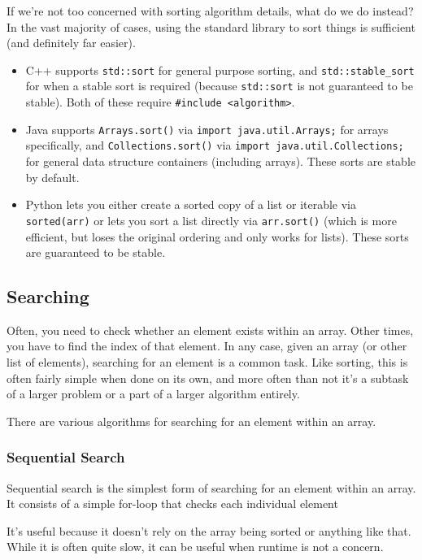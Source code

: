 If we're not too concerned with sorting algorithm details, what do we do instead? In the vast majority of cases, using the standard library to sort things is sufficient (and definitely far easier).
\begin{itemize}
\item C++ supports \texttt{std::sort} for general purpose sorting, and \texttt{std::stable_sort} for when a stable sort is required (because \texttt{std::sort} is not guaranteed to be stable). Both of these require \texttt{#include <algorithm>}.
\item Java supports \texttt{Arrays.sort()} via \texttt{import java.util.Arrays;} for arrays specifically, and \texttt{Collections.sort()} via \texttt{import java.util.Collections;} for general data structure containers (including arrays). These sorts are stable by default.
\item Python lets you either create a sorted copy of a list or iterable via \texttt{sorted(arr)} or lets you sort a list directly via \texttt{arr.sort()} (which is more efficient, but loses the original ordering and only works for lists). These sorts are guaranteed to be stable.
\end{itemize}

\subsection{Searching}

Often, you need to check whether an element exists within an array. Other times, you have to find the index of that element. In any case, given an array (or other list of elements), searching for an element is a common task. Like sorting, this is often fairly simple when done on its own, and more often than not it's a subtask of a larger problem or a part of a larger algorithm entirely.

There are various algorithms for searching for an element within an array.

\subsubsection{Sequential Search}

Sequential search is the simplest form of searching for an element within an array. It consists of a simple for-loop that checks each individual element 

It's useful because it doesn't rely on the array being sorted or anything like that. While it is often quite slow, it can be useful when runtime is not a concern.

